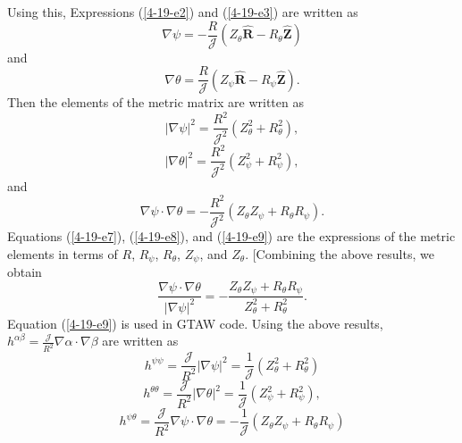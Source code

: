 \documentclass{article}
\begin{document}
Using this, Expressions (\ref{4-19-e2}) and (\ref{4-19-e3}) are written as
\begin{equation}
  \label{6-9-e1} \nabla \psi = - \frac{R}{\mathcal{J}} (Z_{\theta}
  \hat{\mathbf{R}} - R_{\theta} \hat{\mathbf{Z}})
\end{equation}
and
\begin{equation}
  \label{6-9-e2} \nabla \theta = \frac{R}{\mathcal{J}} (Z_{\psi}
  \hat{\mathbf{R}} - R_{\psi} \hat{\mathbf{Z}}) .
\end{equation}
Then the elements of the metric matrix are written as
\begin{equation}
  \label{4-19-e7} | \nabla \psi |^2 = \frac{R^2}{\mathcal{J}^2} (Z_{\theta}^2
  + R_{\theta}^2),
\end{equation}
\begin{equation}
  \label{4-19-e8} | \nabla \theta |^2 = \frac{R^2}{\mathcal{J}^2} (Z_{\psi}^2
  + R_{\psi}^2),
\end{equation}
and
\begin{equation}
  \label{4-19-e9} \nabla \psi \cdot \nabla \theta = -
  \frac{R^2}{\mathcal{J}^2} (Z_{\theta} Z_{\psi} + R_{\theta} R_{\psi}) .
\end{equation}
Equations (\ref{4-19-e7}), (\ref{4-19-e8}), and (\ref{4-19-e9}) are the
expressions of the metric elements in terms of $R$, $R_{\psi}$, $R_{\theta}$,
$Z_{\psi}$, and $Z_{\theta}$. [Combining the above results, we obtain
\begin{equation}
  \label{11-11-1} \frac{\nabla \psi \cdot \nabla \theta}{| \nabla \psi |^2} =
  - \frac{Z_{\theta} Z_{\psi} + R_{\theta} R_{\psi}}{Z_{\theta}^2 +
  R_{\theta}^2} .
\end{equation}
Equation (\ref{4-19-e9}) is used in GTAW code. Using the above results,
$h^{\alpha \beta} = \frac{\mathcal{J}}{R^2} \nabla \alpha \cdot \nabla \beta$
are written as
\begin{equation}
  h^{\psi \psi} = \frac{\mathcal{J}}{R^2} | \nabla \psi |^2 =
  \frac{1}{\mathcal{J}} (Z_{\theta}^2 + R_{\theta}^2)
\end{equation}
\begin{equation}
  h^{\theta \theta} = \frac{\mathcal{J}}{R^2} | \nabla \theta |^2 =
  \frac{1}{\mathcal{J}} (Z_{\psi}^2 + R_{\psi}^2),
\end{equation}
\begin{equation}
  h^{\psi \theta} = \frac{\mathcal{J}}{R^2} \nabla \psi \cdot \nabla \theta =
  - \frac{1}{\mathcal{J}} (Z_{\theta} Z_{\psi} + R_{\theta} R_{\psi})
\end{equation}
\end{document}
